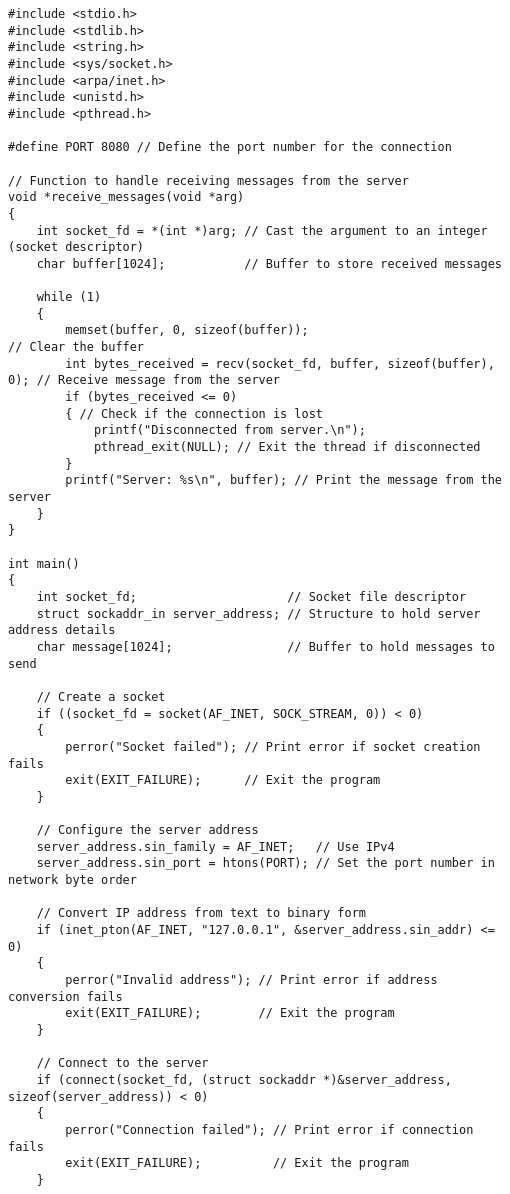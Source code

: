 \documentclass[a4paper,12pt]{article}
\begin{document}
\begin{lstlisting}[caption={Local System Client Code}, label={lst:local-client}]
#include <stdio.h>
#include <stdlib.h>
#include <string.h>
#include <sys/socket.h>
#include <arpa/inet.h>
#include <unistd.h>
#include <pthread.h>

#define PORT 8080 // Define the port number for the connection

// Function to handle receiving messages from the server
void *receive_messages(void *arg)
{
    int socket_fd = *(int *)arg; // Cast the argument to an integer (socket descriptor)
    char buffer[1024];           // Buffer to store received messages

    while (1)
    {
        memset(buffer, 0, sizeof(buffer));                               // Clear the buffer
        int bytes_received = recv(socket_fd, buffer, sizeof(buffer), 0); // Receive message from the server
        if (bytes_received <= 0)
        { // Check if the connection is lost
            printf("Disconnected from server.\n");
            pthread_exit(NULL); // Exit the thread if disconnected
        }
        printf("Server: %s\n", buffer); // Print the message from the server
    }
}

int main()
{
    int socket_fd;                     // Socket file descriptor
    struct sockaddr_in server_address; // Structure to hold server address details
    char message[1024];                // Buffer to hold messages to send

    // Create a socket
    if ((socket_fd = socket(AF_INET, SOCK_STREAM, 0)) < 0)
    {
        perror("Socket failed"); // Print error if socket creation fails
        exit(EXIT_FAILURE);      // Exit the program
    }

    // Configure the server address
    server_address.sin_family = AF_INET;   // Use IPv4
    server_address.sin_port = htons(PORT); // Set the port number in network byte order

    // Convert IP address from text to binary form
    if (inet_pton(AF_INET, "127.0.0.1", &server_address.sin_addr) <= 0)
    {
        perror("Invalid address"); // Print error if address conversion fails
        exit(EXIT_FAILURE);        // Exit the program
    }

    // Connect to the server
    if (connect(socket_fd, (struct sockaddr *)&server_address, sizeof(server_address)) < 0)
    {
        perror("Connection failed"); // Print error if connection fails
        exit(EXIT_FAILURE);          // Exit the program
    }


\end{lstlisting}
\end{document}
